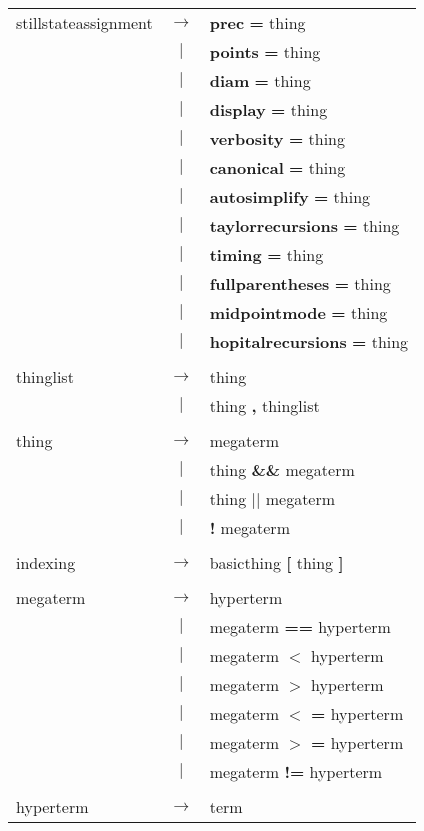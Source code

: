 \begin{tabular}{lcl}
stillstateassignment & $\rightarrow$ & \textbf{prec} \textbf{=} thing \\
 & $|$ & \textbf{points} \textbf{=} thing \\
 & $|$ & \textbf{diam} \textbf{=} thing \\
 & $|$ & \textbf{display} \textbf{=} thing \\
 & $|$ & \textbf{verbosity} \textbf{=} thing \\
 & $|$ & \textbf{canonical} \textbf{=} thing \\
 & $|$ & \textbf{autosimplify} \textbf{=} thing \\
 & $|$ & \textbf{taylorrecursions} \textbf{=} thing \\
 & $|$ & \textbf{timing} \textbf{=} thing \\
 & $|$ & \textbf{fullparentheses} \textbf{=} thing \\
 & $|$ & \textbf{midpointmode} \textbf{=} thing \\
 & $|$ & \textbf{hopitalrecursions} \textbf{=} thing \\
 & & \\
thinglist & $\rightarrow$ & thing \\
 & $|$ & thing \textbf{,} thinglist \\
 & & \\
thing & $\rightarrow$ & megaterm \\
 & $|$ & thing \textbf{\&\&} megaterm \\
 & $|$ & thing \textbf{$|$$|$} megaterm \\
 & $|$ & \textbf{!} megaterm \\
 & & \\
indexing & $\rightarrow$ & basicthing \textbf{[} thing \textbf{]} \\
 & & \\
megaterm & $\rightarrow$ & hyperterm \\
 & $|$ & megaterm \textbf{==} hyperterm \\
 & $|$ & megaterm \textbf{$<$} hyperterm \\
 & $|$ & megaterm \textbf{$>$} hyperterm \\
 & $|$ & megaterm \textbf{$<$} \textbf{=} hyperterm \\
 & $|$ & megaterm \textbf{$>$} \textbf{=} hyperterm \\
 & $|$ & megaterm \textbf{!=} hyperterm \\
 & & \\
hyperterm & $\rightarrow$ & term \\

\end{tabular}
